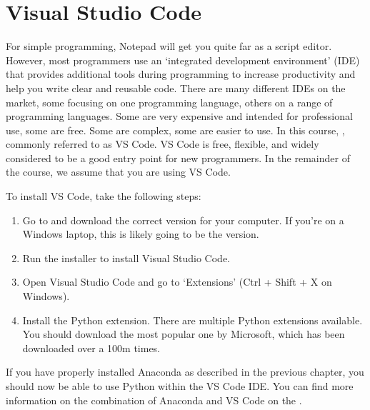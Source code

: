 \documentclass[letterpaper,10pt,english]{jupyterBook}
\begin{document}
\section{Visual Studio Code}
\label{\detokenize{notebooks/01_GettingStarted/01_GettingStarted_student:visual-studio-code}}
\sphinxAtStartPar
For simple programming, Notepad will get you quite far as a script editor. However, most programmers use an ‘integrated development environment’ (IDE) that provides additional tools during programming to increase productivity and help you write clear and reusable code. There are many different IDEs on the market, some focusing on one programming language, others on a range of programming languages. Some are very expensive and intended for professional use, some are free. Some are complex, some are easier to use. In this course, , commonly referred to as VS Code. VS Code is free, flexible, and widely considered to be a good entry point for new programmers. In the remainder of the course, we assume that you are using VS Code.

\sphinxAtStartPar
To install VS Code, take the following steps:
\begin{enumerate}
%
\item {} 
\sphinxAtStartPar
Go to  and download the correct version for your computer. If you’re on a Windows laptop, this is likely going to be the   version.

\item {} 
\sphinxAtStartPar
Run the installer to install Visual Studio Code.

\item {} 
\sphinxAtStartPar
Open Visual Studio Code and go to ‘Extensions’ (Ctrl + Shift + X on Windows).

\item {} 
\sphinxAtStartPar
Install the Python extension.  There are multiple Python extensions available. You should download the most popular one by Microsoft, which has been downloaded over a 100m times.

\end{enumerate}

\sphinxAtStartPar
If you have properly installed Anaconda as described in the previous chapter, you should now be able to use Python within the VS Code IDE. You can find more information on the combination of Anaconda and VS Code on the .
\end{document}
